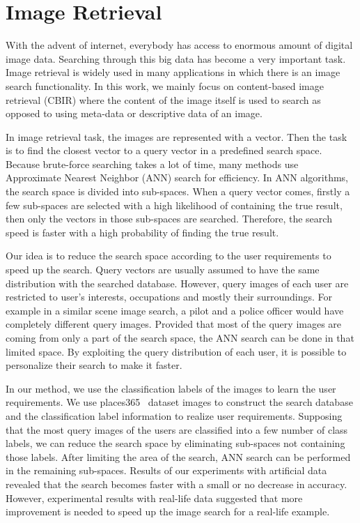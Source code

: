\section{Image Retrieval}

With the advent of internet, everybody has access to enormous amount of digital image data. 
Searching through this big data has become a very important task. 
Image retrieval is widely used in many applications 
in which there is an image search functionality. 
In this work, we mainly focus on content-based image retrieval (CBIR)
where the content of the image itself is used to search
as opposed to using meta-data or descriptive data of an image.

In image retrieval task, the images are represented with a vector.
Then the task is to find the closest vector to a query vector in a predefined search space. 
Because brute-force searching takes a lot of time, many methods use Approximate Nearest Neighbor (ANN) search for efficiency. 
In ANN algorithms, the search space is divided into sub-spaces. 
When a query vector comes, firstly a few sub-spaces are selected with a high likelihood of containing the true result, 
then only the vectors in those sub-spaces are searched.
Therefore, the search speed is faster with a high probability of finding the true result.

Our idea is to reduce the search space according to the user requirements to speed up the search. 
Query vectors are usually assumed to have the same distribution with the searched database. 
However, query images of each user are restricted to user's interests, occupations and mostly their surroundings.
For example in a similar scene image search, a pilot and a police officer would have completely different query images.
Provided that most of the query images are coming from only a part of the search space, the ANN search can be done in that limited space. 
By exploiting the query distribution of each user, it is possible to personalize their search to make it faster.

In our method, we use the classification labels of the images to learn the user requirements. 
We use places365~\cite{zhou2017places} dataset images to construct the search database and the classification label information to realize user requirements.
Supposing that the most query images of the users are classified into a few number of class labels, we can reduce the search space by eliminating sub-spaces not containing those labels.
After limiting the area of the search, ANN search can be performed in the remaining sub-spaces.
Results of our experiments with artificial data revealed that the search becomes faster with a small or no decrease in accuracy. 
However, experimental results with real-life data suggested that more improvement is needed to speed up the image search for a real-life example.


